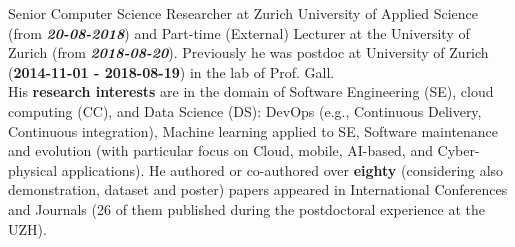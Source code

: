 \documentclass[11pt]{article}
\begin{document}
Senior Computer Science Researcher at Zurich University of Applied Science (from \textit{\textbf{20-08-2018}}) and Part-time (External) Lecturer at the University of Zurich (from \textit{\textbf{2018-08-20}}). Previously he was postdoc at University of Zurich (\textbf{2014-11-01 - 2018-08-19}) in the lab of Prof. Gall. 
\medskip\\
His  \textbf{research interests} are in the domain of Software Engineering (SE), cloud computing (CC), and Data Science (DS): DevOps (e.g., Continuous Delivery, Continuous integration), Machine learning applied to SE, Software maintenance and evolution (with particular focus on Cloud, mobile, AI-based, and Cyber-physical applications). 
He authored or co-authored over \textbf{eighty} (considering also demonstration, dataset 
  and poster) papers appeared in International Conferences and Journals (26 of them published during the postdoctoral experience at the UZH). 
\end{document}
